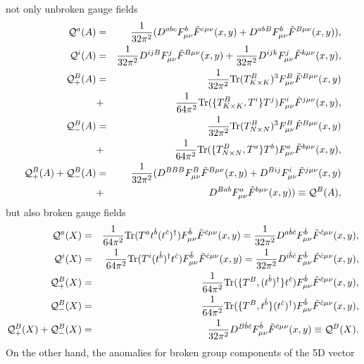 \documentclass[a4paper,12pt]{article}
\begin{document}
not only unbroken gauge fields 
\begin{eqnarray}
{\cal Q}^a(A)&=&\frac{1}{32\pi^2}(D^{abc}F^b_{\mu\nu}{\tilde F}^{c\mu\nu}(x,y)
+D^{abB} F^b_{\mu\nu}{\tilde F}^{B\mu\nu}(x,y)), \\
{\cal Q}^i(A)&=&\frac{1}{32\pi^2}D^{ijB}F^j_{\mu\nu}
{\tilde F}^{B\mu\nu}(x,y)+\frac{1}{32\pi^2}D^{ijk}F^j_{\mu\nu}
{\tilde F}^{k\mu\nu}(x,y), \\
{\cal Q}^B_+(A)&=&\frac{1}{32\pi^2}{\rm Tr}(T^B_{K\times K})^3
F^B_{\mu\nu}{\tilde F}^{B\mu\nu}(x,y)\nonumber \\
&+&\frac{1}{64\pi^2}{\rm Tr}(\{T^B_{K\times K},T^i\}T^j)F^i_{\mu\nu}
{\tilde F}^{j\mu\nu}(x,y), \\ 
{\cal Q}^B_-(A)&=&\frac{1}{32\pi^2}{\rm Tr}(T^B_{N\times N})^3
F^B_{\mu\nu}{\tilde F}^{B\mu\nu}(x,y) \nonumber \\
&+&\frac{1}{64\pi^2}{\rm Tr}(\{T^B_{N\times N},T^a\}T^b)F^a_{\mu\nu}
{\tilde F}^{b\mu\nu}(x,y), \\
{\cal Q}^B_+(A)+{\cal Q}^B_-(A)&=&\frac{1}{32\pi^2}(D^{BBB}
F^B_{\mu\nu}{\tilde F}^{B\mu\nu}(x,y)
+D^{Bij}F^i_{\mu\nu}{\tilde F}^{j\mu\nu}(x,y) \nonumber \\
&+&D^{Bab}F^a_{\mu\nu}{\tilde F}^{b\mu\nu}(x,y))\equiv {\cal Q}^B(A), 
\end{eqnarray}
but also broken gauge fields 
\begin{eqnarray}
{\cal Q}^a(X)&=&\frac{1}{64\pi^2}{\rm Tr}(T^a t^{\hat b}(t^{\hat c})^\dagger)
F^{\hat b}_{\mu\nu}{\tilde F}^{{\hat c}\mu\nu}(x,y)
=\frac{1}{32\pi^2}D^{a{\hat b}{\hat c}}
F^{\hat b}_{\mu\nu}{\tilde F}^{{\hat c}\mu\nu}(x,y),\\
{\cal Q}^i(X)&=&\frac{1}{64\pi^2}{\rm Tr}(T^i (t^{\hat b})^\dagger t^{\hat c})
F^{\hat b}_{\mu\nu}{\tilde F}^{{\hat c}\mu\nu}(x,y)
=\frac{1}{32\pi^2}D^{i{\hat b}{\hat c}}
F^{\hat b}_{\mu\nu}{\tilde F}^{{\hat c}\mu\nu}(x,y), \\
{\cal Q}^B_+(X)&=&\frac{1}{64\pi^2}{\rm Tr}
(\{T^B,(t^{\hat b})^\dagger\}t^{\hat c})
F^{\hat b}_{\mu\nu}{\tilde F}^{{\hat c}\mu\nu}(x,y),  \\
{\cal Q}^B_-(X)&=&\frac{1}{64\pi^2}{\rm Tr}
(\{T^B,t^{\hat b}\}(t^{\hat c})^\dagger)
F^{\hat b}_{\mu\nu}{\tilde F}^{{\hat c}\mu\nu}(x,y), \\
{\cal Q}^B_+(X)+{\cal Q}^B_-(X)
&=&\frac{1}{32\pi^2}D^{B{\hat b}{\hat c}}
F^{\hat b}_{\mu\nu}{\tilde F}^{{\hat c}\mu\nu}(x,y)\equiv {\cal Q}^B(X).
\end{eqnarray}
On the other hand, the anomalies for broken group components of the 5D vector 
\end{document}
